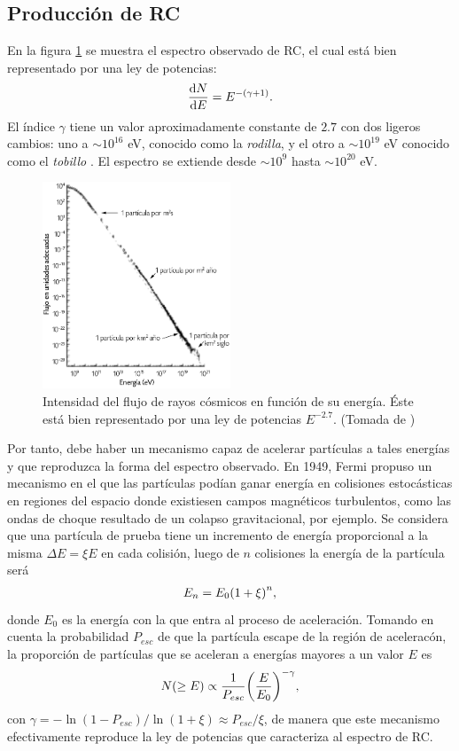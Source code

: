 	\subsection{Producción de RC}		
	En la figura \ref{fig:espectro} se muestra el espectro observado de RC, el cual está bien representado por una ley de potencias:
	\begin{align}
	\dv{N}{E}=E^{-(\gamma+1)}.
	\end{align}	
	El índice $\gamma$ tiene un valor aproximadamente constante de $2.7$ con dos ligeros cambios: uno a $\sim 10^{16}$ eV, conocido como la \textit{rodilla}, y el otro a $\sim 10^{19}$ eV conocido como el \textit{tobillo} \cite{Extremas}. El espectro se extiende desde  $\sim 10^9$ hasta $\sim 10^{20}$ eV.
	
	\begin{figure}[h]
	\centering	
	\includegraphics[width=0.5\textwidth]{Figuras/espectro_RC} 
	\caption{Intensidad del flujo de rayos cósmicos en función de su energía. Éste está bien representado por una ley de potencias $E^{-2.7}$. (Tomada de \cite{Poderosas})}
	\label{fig:espectro}
	\end{figure}	

	Por tanto, debe haber un mecanismo capaz de acelerar partículas a tales energías y que reproduzca la forma del espectro observado. En 1949, Fermi propuso un mecanismo en el que las partículas podían ganar energía en colisiones estocásticas en regiones del espacio donde existiesen campos magnéticos turbulentos, como las ondas de choque resultado de un colapso gravitacional, por ejemplo. Se considera que una partícula de prueba tiene un incremento de energía proporcional a la misma $\Delta E = \xi E$ en cada colisión, luego de $n$ colisiones la energía de la partícula será \cite{Gaisser1990}
	\begin{align}
	E_n = E_0 \qty(1+\xi)^n,
	\end{align}
donde $E_0$ es la energía con la que entra al proceso de aceleración. Tomando en cuenta la probabilidad $P_{esc}$ de que la partícula escape de la región de aceleracón, la proporción de partículas que se aceleran a energías mayores a un valor $E$ es
	\begin{align}
	N(\geq E) \propto \frac{1}{P_{esc}}\qty(\frac{E}{E_0})^{-\gamma},
	\end{align}
	con $\gamma = -\ln(1-P_{esc})/\ln(1+\xi) \approx P_{esc}/\xi$, de manera que este mecanismo efectivamente reproduce la ley de potencias que caracteriza al espectro de RC. \\
	
